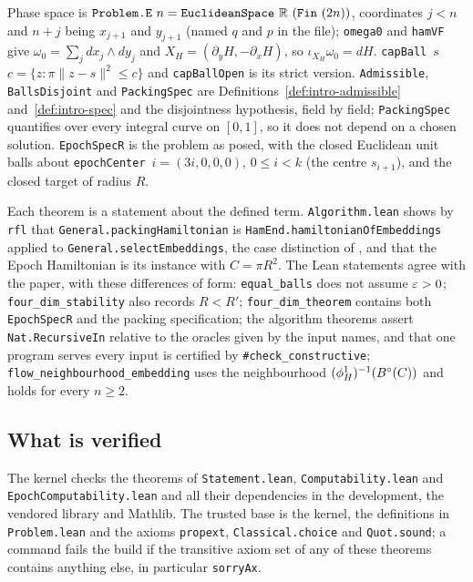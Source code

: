 Phase space is $\texttt{Problem.E}~n=\texttt{EuclideanSpace}\ \R\ (\texttt{Fin}\ (2n))$, coordinates $j<n$ and $n+j$
being $x_{j+1}$ and $y_{j+1}$ (named $q$ and $p$ in the file); \texttt{omega0} and \texttt{hamVF} give $\omega_0=\sum_jdx_j\wedge dy_j$ and
$X_H=(\partial_yH,-\partial_xH)$, so $\iota_{X_H}\omega_0=dH$. \texttt{capBall}~$s$~$c=\{z:\pi\|z-s\|^2\le c\}$ and
\texttt{capBallOpen} is its strict version. \texttt{Admissible}, \texttt{BallsDisjoint} and \texttt{PackingSpec} are
Definitions~\ref{def:intro-admissible} and~\ref{def:intro-spec} and the disjointness hypothesis, field by field;
\texttt{PackingSpec} quantifies over every integral curve on $[0,1]$, so it does not depend on a chosen solution.
\texttt{EpochSpecR} is the problem as posed, with the closed Euclidean unit balls about
\texttt{epochCenter}~$i=(3i,0,0,0)$, $0\le i<k$ (the centre $s_{i+1}$), and the closed target of radius $R$.

Each theorem is a statement about the defined term. \texttt{Algorithm.lean} shows by \texttt{rfl} that
\texttt{General.packingHamiltonian} is \texttt{HamEnd.hamiltonianOfEmbeddings} applied to
\texttt{General.selectEmbeddings}, the case distinction of , and that the Epoch
Hamiltonian is its instance with $C=\pi R^2$. The Lean statements agree with the paper, with these differences of
form: \texttt{equal\_balls} does not assume $\varepsilon>0$; \texttt{four\_dim\_stability} also records $R<R'$;
\texttt{four\_dim\_theorem} contains both \texttt{EpochSpecR} and the packing specification; the algorithm theorems
assert \texttt{Nat.RecursiveIn} relative to the oracles given by the input names, and that one program serves every
input is certified by \texttt{\#check\_constructive}; \texttt{flow\_neighbourhood\_embedding} uses the neighbourhood
$(\phi^1_H)^{-1}(B^{\circ}(C))$ and holds for every $n\ge2$.

\subsection*{What is verified}

The kernel checks the theorems of \texttt{Statement.lean}, \texttt{Computability.lean} and
\texttt{EpochComputability.lean} and all their dependencies in the development, the vendored library and Mathlib. The
trusted base is the kernel, the definitions in \texttt{Problem.lean} and the axioms \texttt{propext},
\texttt{Classical.choice} and \texttt{Quot.sound}; a command fails the build if the transitive axiom set of any of
these theorems contains anything else, in particular \texttt{sorryAx}.

